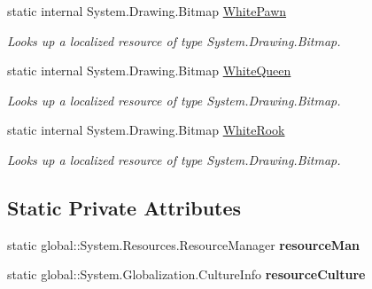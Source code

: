 \begin{DoxyCompactItemize}
static internal System.\+Drawing.\+Bitmap \mbox{\hyperlink{class_chess_tracking_1_1_properties_1_1_resources_a95783be52461bd1c59804dfd8fa0ba9f}{White\+Pawn}}
\begin{DoxyCompactList}\small\item\em Looks up a localized resource of type System.\+Drawing.\+Bitmap. \end{DoxyCompactList}\item 
static internal System.\+Drawing.\+Bitmap \mbox{\hyperlink{class_chess_tracking_1_1_properties_1_1_resources_a0640d248f900a288b62bc17d50393d4e}{White\+Queen}}
\begin{DoxyCompactList}\small\item\em Looks up a localized resource of type System.\+Drawing.\+Bitmap. \end{DoxyCompactList}\item 
static internal System.\+Drawing.\+Bitmap \mbox{\hyperlink{class_chess_tracking_1_1_properties_1_1_resources_a83b1d5e7dc68f14ae9316ed90e634820}{White\+Rook}}
\begin{DoxyCompactList}\small\item\em Looks up a localized resource of type System.\+Drawing.\+Bitmap. \end{DoxyCompactList}\end{DoxyCompactItemize}
\subsection*{Static Private Attributes}
\begin{DoxyCompactItemize}
\item 
\mbox{\label{class_chess_tracking_1_1_properties_1_1_resources_a7d6ce85b4e1500cbea209637940f0c19}} 
static global\+::\+System.\+Resources.\+Resource\+Manager {\bfseries resource\+Man}
\item 
\mbox{\label{class_chess_tracking_1_1_properties_1_1_resources_afde70096656692c2ed2704dc4d202f3f}} 
static global\+::\+System.\+Globalization.\+Culture\+Info {\bfseries resource\+Culture}
\end{DoxyCompactItemize}


